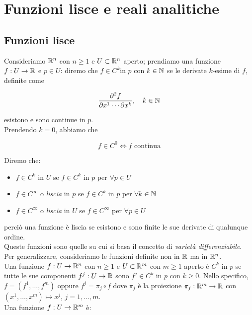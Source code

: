 \section{Funzioni lisce e reali analitiche}

\subsection{Funzioni lisce}

Consideriamo $ \mathbb{R}^{n} $ con $ n \geq 1 $ e $ U \subset \mathbb{R}^{n} $ aperto; prendiamo una funzione $ f : U \to \mathbb{R} $ e $ p \in U $: diremo che $ f \in C^{k} $in $ p $ con $ k \in \mathbb{N} $ se le derivate $ k $-esime di $ f $, definite come

\begin{equation}
	\pdv[k]{f}{x^{1} \cdots}{x^{k}} \qcomma k \in \N
\end{equation}

esistono e sono continue in $ p $.\\
Prendendo $ k = 0 $, abbiamo che

\begin{equation}
	f \in C^{0} \iff f \text{ continua}
\end{equation}

Diremo che:

\begin{itemize}
	\item $ f \in C^{k} $ in $ U $ se $ f \in C^{k} $ in $ p $ per $ \forall p \in U $
	
	\item $ f \in C^{\infty} $ o \textit{liscia} in $ p $ se $ f \in C^{k} $ in $ p $ per $ \forall k \in \mathbb{N} $
	
	\item $ f \in C^{\infty} $ o \textit{liscia} in $ U $ se $ f \in C^{\infty} $ per $ \forall p \in U $
\end{itemize}

perciò una funzione è liscia se esistono e sono finite le sue derivate di qualunque ordine.\\
Queste funzioni sono quelle su cui si basa il concetto di \textit{varietà differenziabile}.\\

Per generalizzare, consideriamo le funzioni definite non in $ \mathbb{R} $ ma in $ \mathbb{R}^{n} $.\\
Una funzione $ f : U \to \mathbb{R}^{n} $ con $ n \geq 1 $ e $ U \subset \mathbb{R}^{m} $ con $ m \geq 1 $ aperto è $ C^{k} $ in $ p $ se tutte le sue componenti $ f^{j} : U \to \mathbb{R} $ sono $ f^{j} \in C^{k} $ in $ p $ con $ k \geq 0 $. Nello specifico, $ f = (f^{1}, \dots, f^{m}) $ oppure $ f^{j} = \pi_{j} \circ f $ dove $ \pi_{j} $ è la proiezione $ \pi_{j} : \mathbb{R}^{m} \to \mathbb{R} $ con $ (x^{1}, \dots, x^{m}) \mapsto x^{j} $, $ j = 1, \dots, m $.\\
Una funzione $ f : U \to \mathbb{R}^{m} $ è:

